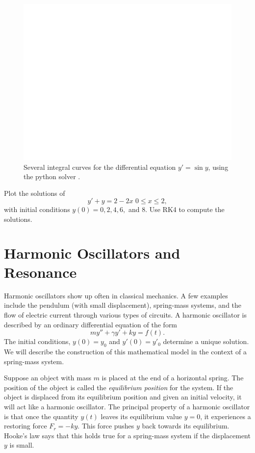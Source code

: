 \begin{figure}
\centering
\includegraphics[width=\textwidth]{Fig4.pdf}
\caption{Several integral curves for the differential equation $y' =\sin y$, using the python solver . }
\label{ivp:int_curves}
\end{figure}

\begin{problem}
Plot the solutions of 
\[ y' + y = 2-2x\,\, 0 \leq x \leq 2, \] 
with initial conditions $y(0) = 0, 2, 4, 6, $ and $8$. Use RK4 to compute the solutions. 
\end{problem}

\pagebreak
\section{Harmonic Oscillators and Resonance}

Harmonic oscillators show up often in classical mechanics. A few examples include the pendulum (with small displacement), spring-mass systems, and the flow of electric current through various types of circuits. 
A harmonic oscillator is described by an ordinary differential equation of the form \[my'' + \gamma y' + ky = f(t) .\] The initial conditions, $y(0) = y_0$ and $y'(0) = y'_0$ determine a unique solution. 
We will describe the construction of this mathematical model in the context of a spring-mass system.

Suppose an object with mass $m$ is placed at the end of a horizontal spring. The position of the object is called the \textit{equilibrium position} for the system.
If the object is displaced from its equilibrium position and given an initial velocity,  
it will act like a harmonic oscillator.
The principal property of a harmonic oscillator is that once the quantity $y(t)$ leaves its equilibrium value $y = 0$, it experiences a restoring force $F_r = -ky.$ This force pushes $y$ back towards its equilibrium. Hooke's law says that this holds true for a 
spring-mass system if the displacement $y$ is small.

